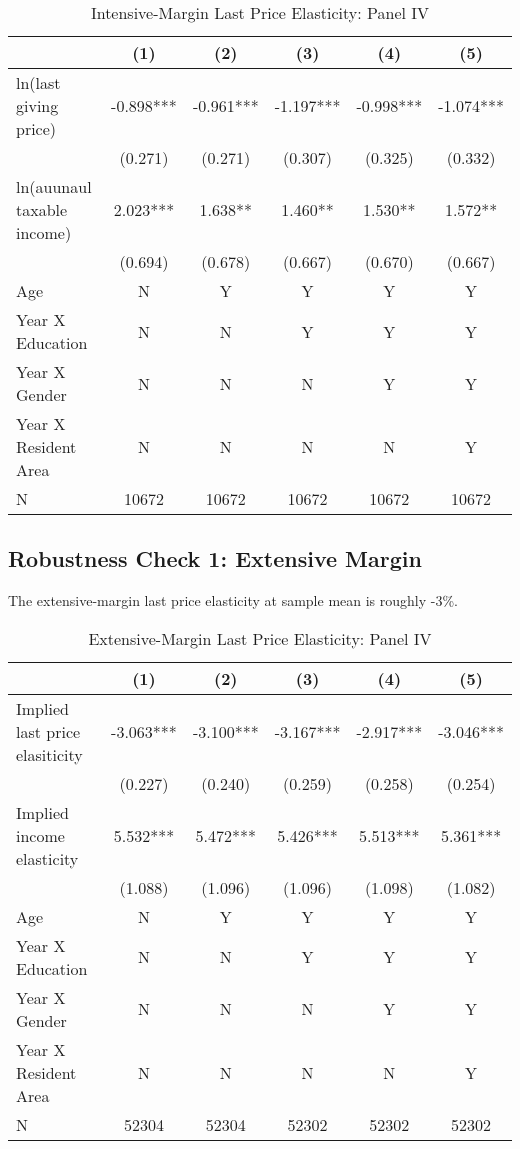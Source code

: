 \documentclass[ review  , 3p ]{elsarticle}
\begin{document}
  \begin{table}

  \caption{\label{tab:kableLastElasticity2Slide1}Intensive-Margin Last Price Elasticity: Panel IV}
  \centering
  \fontsize{7}{9}\selectfont
  \begin{tabular}[t]{lccccc}
  \toprule
   & (1) & (2) & (3) & (4) & (5)\\
  \midrule
  ln(last giving price) & -0.898*** & -0.961*** & -1.197*** & -0.998*** & -1.074***\\
   & (0.271) & (0.271) & (0.307) & (0.325) & (0.332)\\
  ln(auunaul taxable income) & 2.023*** & 1.638** & 1.460** & 1.530** & 1.572**\\
   & (0.694) & (0.678) & (0.667) & (0.670) & (0.667)\\
  Age & N & Y & Y & Y & Y\\
  Year X Education & N & N & Y & Y & Y\\
  Year X Gender & N & N & N & Y & Y\\
  Year X Resident Area & N & N & N & N & Y\\
  N & 10672 & 10672 & 10672 & 10672 & 10672\\
  \bottomrule
  \end{tabular}
  \end{table}

  \hypertarget{robustness-check-1-extensive-margin}{%
  \subsection{Robustness Check 1: Extensive Margin}\label{robustness-check-1-extensive-margin}}

  The extensive-margin last price elasticity at sample mean is roughly -3\%.

  \begin{table}

  \caption{\label{tab:kableLastElasticity2Slide2}Extensive-Margin Last Price Elasticity: Panel IV}
  \centering
  \fontsize{7}{9}\selectfont
  \begin{tabular}[t]{lccccc}
  \toprule
   & (1) & (2) & (3) & (4) & (5)\\
  \midrule
  Implied last price elasiticity & -3.063*** & -3.100*** & -3.167*** & -2.917*** & -3.046***\\
   & (0.227) & (0.240) & (0.259) & (0.258) & (0.254)\\
  Implied income elasticity & 5.532*** & 5.472*** & 5.426*** & 5.513*** & 5.361***\\
   & (1.088) & (1.096) & (1.096) & (1.098) & (1.082)\\
  Age & N & Y & Y & Y & Y\\
  Year X Education & N & N & Y & Y & Y\\
  Year X Gender & N & N & N & Y & Y\\
  Year X Resident Area & N & N & N & N & Y\\
  N & 52304 & 52304 & 52302 & 52302 & 52302\\
  \bottomrule
  \end{tabular}
  \end{table}
\end{document}
